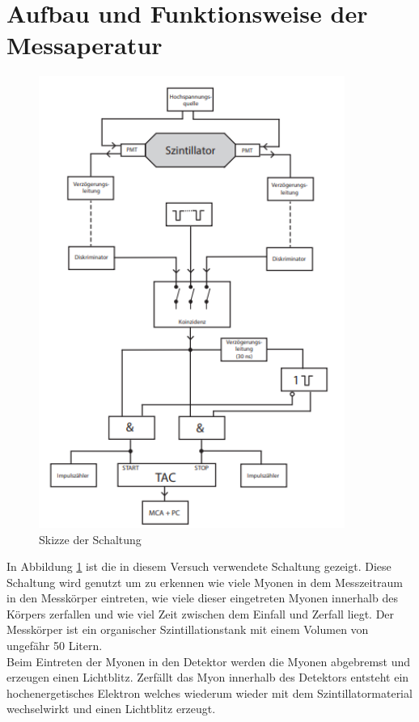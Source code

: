 \newpage
\section{Aufbau und Funktionsweise der Messaperatur}

	\begin{figure}
		\includegraphics[width=10cm]{latex/images/Aufbau.png}
		\caption{Skizze der Schaltung \cite{V01}}
		\label{fig:Aufb}
	\end{figure}
    In Abbildung \ref{fig:Aufb} ist die in diesem Versuch verwendete Schaltung gezeigt.
    Diese Schaltung wird genutzt um zu erkennen wie viele Myonen in dem Messzeitraum in den Messkörper eintreten, wie viele dieser eingetreten Myonen innerhalb des Körpers zerfallen und wie viel Zeit zwischen dem Einfall und Zerfall liegt.
    Der Messkörper ist ein organischer Szintillationstank mit einem Volumen von ungefähr 50 Litern.\\
    Beim Eintreten der Myonen in den Detektor werden die Myonen abgebremst und erzeugen einen Lichtblitz.
    Zerfällt das Myon innerhalb des Detektors entsteht ein hochenergetisches Elektron welches wiederum wieder mit dem Szintillatormaterial wechselwirkt und einen Lichtblitz erzeugt.
